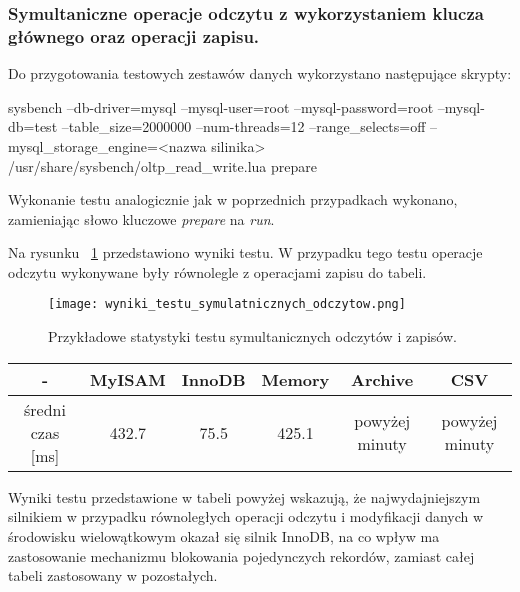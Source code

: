 \subsubsection{Symultaniczne operacje odczytu z wykorzystaniem klucza głównego oraz operacji zapisu.}

Do przygotowania testowych zestawów danych wykorzystano następujące skrypty:
\begin{spverbatim}
	sysbench --db-driver=mysql --mysql-user=root --mysql-password=root
	--mysql-db=test --table_size=2000000 --num-threads=12
	--range_selects=off --mysql_storage_engine=<nazwa silinika>
	/usr/share/sysbench/oltp_read_write.lua prepare
\end{spverbatim}

Wykonanie testu analogicznie jak w poprzednich przypadkach wykonano, zamieniając słowo kluczowe \textit{prepare} na \textit{run}.


Na rysunku ~\ref{fig:wyniki_testu_symulatnicznych_odczytow} przedstawiono wyniki testu. W przypadku tego testu operacje odczytu wykonywane były równolegle z operacjami zapisu do tabeli.
\begin{figure}[H]
	\caption{Przykładowe statystyki testu symultanicznych odczytów i zapisów.}
	\centering
	\texttt{[image: wyniki\_testu\_symulatnicznych\_odczytow.png]}
	\label{fig:wyniki_testu_symulatnicznych_odczytow}
\end{figure}
\begin{center}
	\begin{tabular}{ | c | c | c | c | c | c |}
		\hline
		- & MyISAM & InnoDB & Memory & Archive & CSV  \\ 
		\hline
		średni czas [ms] & 432.7 & 75.5 & 425.1 & powyżej minuty & powyżej minuty \\
		\hline
	\end{tabular}
\end{center}
Wyniki testu przedstawione w tabeli powyżej wskazują, że najwydajniejszym silnikiem w przypadku równoległych operacji odczytu i modyfikacji danych w środowisku wielowątkowym okazał się silnik InnoDB, na co wpływ ma zastosowanie mechanizmu blokowania pojedynczych rekordów, zamiast całej tabeli zastosowany w pozostałych.

